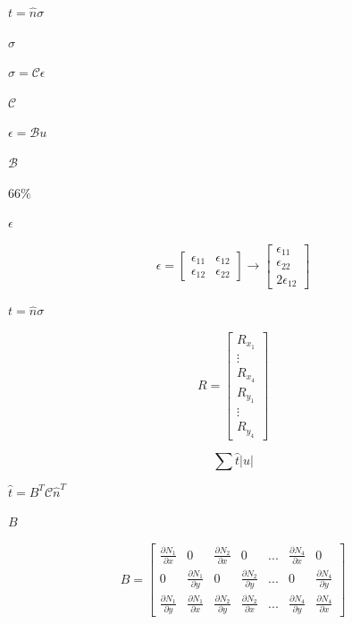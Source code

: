 \documentclass{article}
\begin{document}
$ t = \hat{n} \sigma$
\pagebreak

$ \sigma $
\pagebreak

$ \sigma = \mathcal{C} \epsilon $
\pagebreak

$ \mathcal{C} $
\pagebreak

$ \epsilon = \mathcal{B} u $
\pagebreak

$ \mathcal{B} $
\pagebreak

$ 66\% $
\pagebreak

$ \epsilon $
\pagebreak

\[ 
\epsilon = \begin{bmatrix} 
            \epsilon_{11} & \epsilon_{12}   \\
            \epsilon_{12} & \epsilon_{22}
          \end{bmatrix}
         \to 
         \begin{bmatrix}
         \epsilon_{11}  \\
         \epsilon_{22}  \\
         2 \epsilon_{12}
         \end{bmatrix}
\]
\pagebreak

$ t = \hat{n} \sigma $
\pagebreak

\[
R = \begin{bmatrix}
    R_{x_1} \\
    \vdots  \\
    R_{x_4} \\
    R_{y_1} \\
    \vdots  \\
    R_{y_4}
    \end{bmatrix}   
\]
\pagebreak

\[
\sum \hat{t} \left| u \right|
\]
\pagebreak

$ \hat{t} = B^T \mathcal{C} \hat{n}^T $
\pagebreak

$ B $
\pagebreak

\[
B = \begin{bmatrix}
    \frac{\partial N_1}{\partial x} &   0   &   \frac{\partial N_2}{\partial x} & 0 & ... & \frac{\partial N_4}{\partial x} &   0   \\
    0 & \frac{\partial N_1}{\partial y} &   0   &   \frac{\partial N_2}{\partial y} & ... & 0   &   \frac{\partial N_4}{\partial y} \\
    \frac{\partial N_1}{\partial y} &   \frac{\partial N_1}{\partial x} &   \frac{\partial N_2}{\partial y} &   \frac{\partial N_2}{\partial x} &   ... &   \frac{\partial N_4}{\partial y} &   \frac{\partial N_4}{\partial x}
    \end{bmatrix}
\]
\pagebreak
\end{document}
